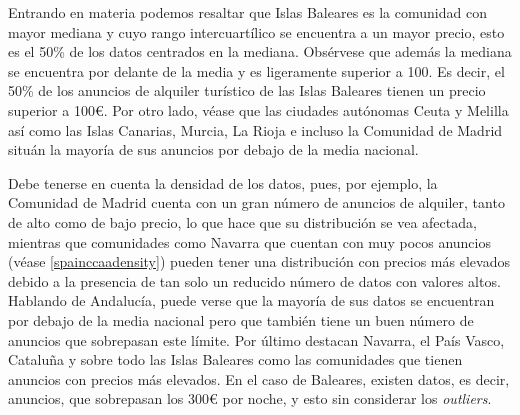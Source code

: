\documentclass[a4paper,10pt]{article}
\begin{document}
            \noindent
            Entrando en materia podemos resaltar que Islas Baleares es la comunidad con mayor mediana y cuyo rango intercuartílico se encuentra a un mayor precio, esto es el 50\% de los datos centrados en la mediana. Obsérvese que además la mediana se encuentra por delante de la media y es ligeramente superior a 100. Es decir, el 50\% de los anuncios de alquiler turístico de las Islas Baleares tienen un precio superior a 100€. Por otro lado, véase que las ciudades autónomas Ceuta y Melilla así como las Islas Canarias, Murcia, La Rioja e incluso la Comunidad de Madrid situán la mayoría de sus anuncios por debajo de la media nacional. 
                
            \clearpage

            \noindent
            Debe tenerse en cuenta la densidad de los datos, pues, por ejemplo, la Comunidad de Madrid cuenta con un gran número de anuncios de alquiler, tanto de alto como de bajo precio, lo que hace que su distribución se vea afectada, mientras que comunidades como Navarra que cuentan con muy pocos anuncios (véase \ref{spainccaadensity}) pueden tener una distribución con precios más elevados debido a la presencia de tan solo un reducido número de datos con valores altos.
            Hablando de Andalucía, puede verse que la mayoría de sus datos se encuentran por debajo de la media nacional pero que también tiene un buen
            número de anuncios que sobrepasan este límite. 
            Por último destacan Navarra, el País Vasco, Cataluña y sobre todo las Islas Baleares como las comunidades que tienen anuncios con precios más elevados. En el caso de Baleares, existen datos, es decir, anuncios, que sobrepasan los 300€ por noche, y esto sin considerar los \textit{outliers}. \\
\end{document}

